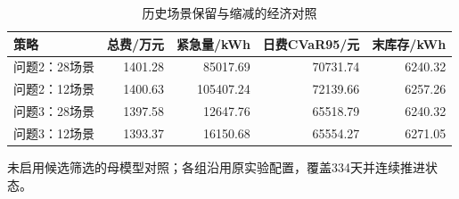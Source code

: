 \begin{table}[htbp]\centering\small
\caption{历史场景保留与缩减的经济对照}
\label{tab:v2_scenarios}
\begin{tabularx}{\linewidth}{LRRRR}\toprule
策略 & 总费/万元 & 紧急量/kWh & 日费CVaR95/元 & 末库存/kWh\\\midrule
问题2：28场景 & 1401.28 & 85017.69 & 70731.74 & 6240.32\\
问题2：12场景 & 1400.63 & 105407.24 & 72139.66 & 6257.26\\
问题3：28场景 & 1397.58 & 12647.76 & 65518.79 & 6240.32\\
问题3：12场景 & 1393.37 & 16150.68 & 65554.27 & 6271.05\\
\bottomrule\end{tabularx}
\par\smallskip\parbox{\linewidth}{\footnotesize 未启用候选筛选的母模型对照；各组沿用原实验配置，覆盖334天并连续推进状态。}
\end{table}
